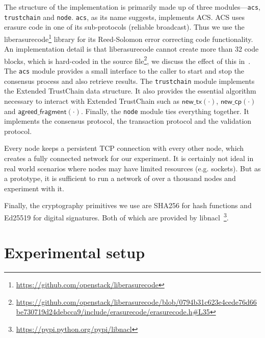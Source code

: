 The structure of the implementation is primarily made up of three modules---\texttt{acs}, \texttt{trustchain} and \texttt{node}.
\texttt{acs}, as its name suggests, implements ACS.
ACS uses erasure code in one of its sub-protocols (reliable broadcast).
Thus we use the liberasurecode\footnote{\url{https://github.com/openstack/liberasurecode}} library for its Reed-Solomon error correcting code functionality.
An implementation detail is that liberasurecode cannot create more than 32 code blocks, which is hard-coded in the source file\footnote{\url{https://github.com/openstack/liberasurecode/blob/0794b31c623e4cede76d66be730719d24debcca9/include/erasurecode/erasurecode.h\#L35}
}, we discuss the effect of this in~.
The \texttt{acs} module provides a small interface to the caller to start and stop the consensus process and also retrieve results.
The \texttt{trustchain} module implements the Extended TrustChain data structure.
It also provides the essential algorithm necessary to interact with Extended TrustChain such as 
$\textsf{new\_tx}(\cdot)$, $\textsf{new\_cp}(\cdot)$ and $\textsf{agreed\_fragment}(\cdot)$.
Finally, the \texttt{node} module ties everything together.
It implements the consensus protocol, the transaction protocol and the validation protocol.


Every node keeps a persistent TCP connection with every other node,
which creates a fully connected network for our experiment.
It is certainly not ideal in real world scenarios where nodes may have limited resources (e.g. sockets).
But as a prototype, it is sufficient to run a network of over a thousand nodes and experiment with it.

Finally, the cryptography primitives we use are SHA256 for hash functions and Ed25519 for digital signatures.
Both of which are provided by libnacl~\footnote{\url{https://pypi.python.org/pypi/libnacl}}.


\section{Experimental setup}
\label{sec:experimental-setup}


